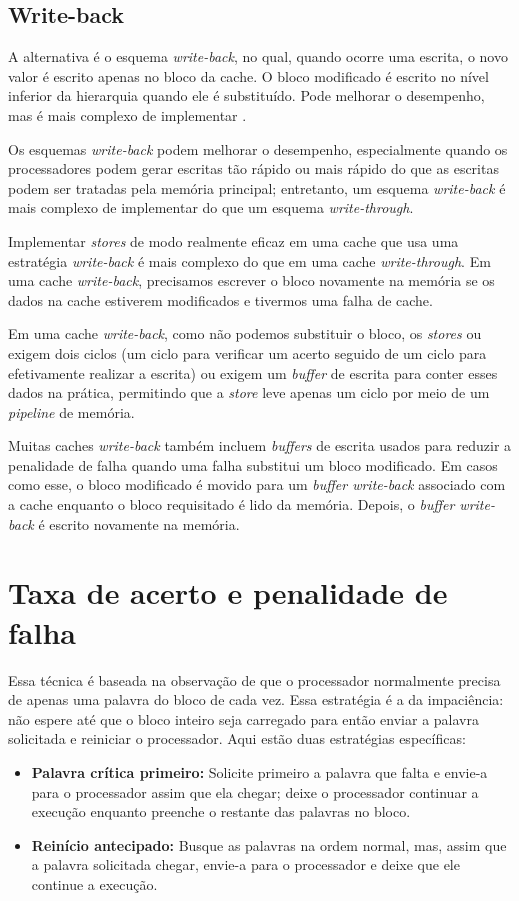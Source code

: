 \subsection{Write-back}
A alternativa é o esquema \textit{write-back}, no qual, quando ocorre uma escrita, o novo valor é escrito apenas no bloco da cache. O bloco modificado é escrito no nível inferior da hierarquia quando ele é substituído. Pode melhorar o desempenho, mas é mais complexo de implementar \cite{hennessy2017}.

Os esquemas \textit{write-back} podem melhorar o desempenho, especialmente quando os processadores podem gerar escritas tão rápido ou mais rápido do que as escritas podem ser tratadas pela memória principal; entretanto, um esquema \textit{write-back} é mais complexo de implementar do que um esquema \textit{write-through}.

Implementar \textit{stores} de modo realmente eficaz em uma cache que usa uma estratégia \textit{write-back} é mais complexo do que em uma cache \textit{write-through}. Em uma cache \textit{write-back}, precisamos escrever o bloco novamente na memória se os dados na cache estiverem modificados e tivermos uma falha de cache.

Em uma cache \textit{write-back}, como não podemos substituir o bloco, os \textit{stores} ou exigem dois ciclos (um ciclo para verificar um acerto seguido de um ciclo para efetivamente realizar a escrita) ou exigem um \textit{buffer} de escrita para conter esses dados na prática, permitindo que a \textit{store} leve apenas um ciclo por meio de um \textit{pipeline} de memória.

Muitas caches \textit{write-back} também incluem \textit{buffers} de escrita usados para reduzir a penalidade de falha quando uma falha substitui um bloco modificado. Em casos como esse, o bloco modificado é movido para um \textit{buffer write-back} associado com a cache enquanto o bloco requisitado é lido da memória. Depois, o \textit{buffer write-back} é escrito novamente na memória.

\section{Taxa de acerto e penalidade de falha}
Essa técnica é baseada na observação de que o processador normalmente precisa de apenas uma palavra do bloco de cada vez. Essa estratégia é a da impaciência: não espere até que o bloco inteiro seja carregado para então enviar a palavra solicitada e reiniciar o processador. Aqui estão duas estratégias específicas:
\begin{itemize}
    \item \textbf{Palavra crítica primeiro:} Solicite primeiro a palavra que falta e envie-a para o processador assim que ela chegar; deixe o processador continuar a execução enquanto preenche o restante das palavras no bloco.
    \item \textbf{Reinício antecipado:} Busque as palavras na ordem normal, mas, assim que a palavra solicitada chegar, envie-a para o processador e deixe que ele continue a execução.
\end{itemize}

